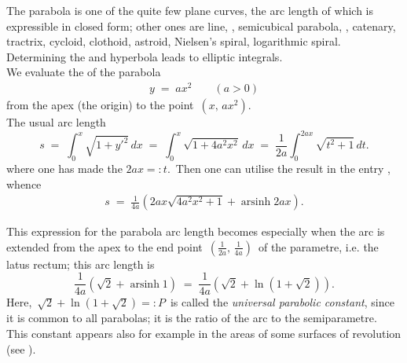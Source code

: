 \documentclass[12pt]{article}
\DeclareMathOperator{\arsinh}{arsinh}
\theoremstyle{definition}
\begin{document}
The parabola is one of the quite few plane curves, the arc length of which is expressible in closed form; other ones are line, , semicubical parabola, , catenary, tractrix, cycloid, clothoid, astroid, Nielsen's spiral,  logarithmic spiral.\, Determining the  and hyperbola leads to elliptic integrals.\\

We evaluate the  of the parabola
\begin{align}
y \;=\; ax^2 \qquad (a > 0)
\end{align}
from the apex (the origin) to the point \,$(x,\,ax^2)$.\\

The usual arc length 
$$s \;=\; \int_0^x\!\sqrt{1\!+\!y'^2}\,dx \;=\; \int_0^x\!\sqrt{1\!+4a^2x^2}\,dx 
\;=\; \frac{1}{2a}\int_0^{2ax}\!\sqrt{t^2\!+\!1}\,dt.$$
where one has made the  $2ax =: t$.\, Then one can utilise the result in the entry , whence
\begin{align}
s \;=\; \frac{1}{4a}\left(2ax\sqrt{4a^2x^2\!+\!1}+\arsinh{2ax}\right).
\end{align}

This expression for the parabola arc length becomes especially  when the arc is extended from the apex to the end point \,$(\frac{1}{2a},\,\frac{1}{4a})$\, of the parametre, i.e. the latus rectum; this arc length is
$$\frac{1}{4a}(\sqrt{2}+\arsinh{1}) \;=\; \frac{1}{4a}\left(\sqrt{2}+\ln(1\!+\!\sqrt{2})\right).$$
Here,\, $\sqrt{2}+\ln(1\!+\!\sqrt{2}) =: P$\, is called the {\it universal parabolic constant}, since it is common to all parabolas; it is the ratio of the arc to the semiparametre.\, This constant appears also for example in the areas of some surfaces of revolution (see ).

\end{document}

